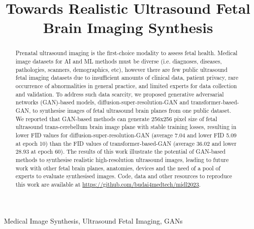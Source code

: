 \documentclass{midl} %
\title[
Towards Realistic Ultrasound Fetal Brain Imaging Synthesis %
]{
Towards Realistic Ultrasound Fetal Brain Imaging Synthesis %
}
\begin{document}
\maketitle

\begin{abstract}
Prenatal ultrasound imaging is the first-choice modality to assess fetal health.
Medical image datasets for AI and ML methods must be diverse (i.e. diagnoses, diseases, pathologies, scanners, demographics, etc), however there are few public ultrasound fetal imaging datasets due to insufficient amounts of clinical data, patient privacy, rare occurrence of abnormalities in general practice, and limited experts for data collection and validation.
To address such data scarcity, we proposed generative adversarial networks (GAN)-based models, diffusion-super-resolution-GAN and transformer-based-GAN, to synthesise images of fetal ultrasound brain planes from one public dataset.
We reported that GAN-based methods can generate 256x256 pixel size of fetal ultrasound trans-cerebellum brain image plane with stable training losses, resulting in lower FID values for diffusion-super-resolution-GAN (average 7.04 and lower FID 5.09 at epoch 10) than the FID values of transformer-based-GAN (average 36.02 and lower 28.93 at epoch 60).
The results of this work illustrate the potential of GAN-based methods to synthesise realistic high-resolution ultrasound images, leading to future work with other fetal brain planes, anatomies, devices and the need of a pool of experts to evaluate synthesised images.
Code, data and other resources to reproduce this work are available at \url{https://github.com/budai4medtech/midl2023}.
\end{abstract}

\begin{keywords}
Medical Image Synthesis, Ultrasound Fetal Imaging, GANs
\end{keywords}
\end{document}
